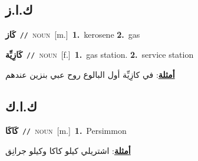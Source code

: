 \documentclass[10pt,a4paper,twoside]{article} %
\begin{document}
\begin{multicols}{2}
{{\vspace{-3mm}
\subsection*{\color{blue}\foreignlanguage{arabic}{ك.ا.ز}\color{blue}{ (ntws)}} 

{\setlength\topsep{0pt}\textbf{\foreignlanguage{arabic}{كَاز}}\ {\color{gray}\texttt{//}\color{black}}\ \textsc{noun}\ [m.]\ \textbf{1.}~kerosene  \textbf{2.}~gas\ 

{\setlength\topsep{0pt}\textbf{\foreignlanguage{arabic}{كَازِيِّة}}\ {\color{gray}\texttt{//}\color{black}}\ \textsc{noun}\ [f.]\ \textbf{1.}~gas station.  \textbf{2.}~service station\  \begin{flushright}\color{gray}\foreignlanguage{arabic}{\textbf{\underline{\foreignlanguage{arabic}{أمثلة}}}: في كازِيِّة أول البالوع روح عبي بنزين عندهم}\end{flushright}\color{black}} \vspace{2mm}

\vspace{-3mm}
\subsection*{\color{blue}\foreignlanguage{arabic}{ك.ا.ك}\color{blue}{ (ntws)}} 

{\setlength\topsep{0pt}\textbf{\foreignlanguage{arabic}{كَاكَا}}\ {\color{gray}\texttt{//}\color{black}}\ \textsc{noun}\ [m.]\ \textbf{1.}~Persimmon\  \begin{flushright}\color{gray}\foreignlanguage{arabic}{\textbf{\underline{\foreignlanguage{arabic}{أمثلة}}}: اشتريلي كيلو كاكا وكيلو جرانِق}\end{flushright}\color{black}} \vspace{2mm}

}}}
\end{multicols}
\end{document}
